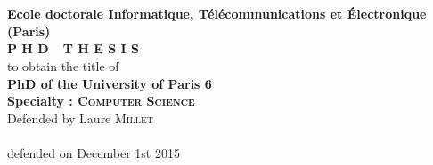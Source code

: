 \thispagestyle{empty}
\newpage
\thispagestyle{empty}

\begin{titlepage}
\thispagestyle{empty}
\begin{center}
 \\
\vspace*{0.5cm}
 \\
\noindent \textbf{Ecole doctorale Informatique, T\'el\'ecommunications et \'Electronique (Paris)} \\
\vspace*{0.8cm}
\noindent \Huge \textbf{P H D\ \ T H E S I S} \\
\vspace*{0.8cm}
\noindent \large {to obtain the title of} \\
\vspace*{0.4cm}
\noindent \LARGE \textbf{PhD of the University of Paris 6} \\
\vspace*{0.5cm}
\noindent \Large \textbf{Specialty : \textsc{Computer Science}}\\
\vspace*{0.6cm} \noindent \large {Defended by} \LARGE Laure \textsc{Millet} \\
\vspace*{0.8cm}
 \\
\vspace*{0.3cm}
\noindent \large defended on December 1st 2015 \\
\end{center}


\end{titlepage}
